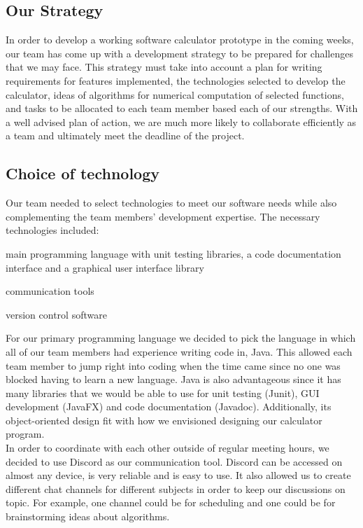 \documentclass[a4paper, 12pt]{article}
\begin{document}
\subsection{Our Strategy}

In order to develop a working software calculator prototype in the coming weeks, our team has come up with a development strategy to be prepared for challenges that we may face. This strategy must take into account a plan for writing requirements for features implemented, the technologies selected to develop the calculator, ideas of algorithms for numerical computation of selected functions, and tasks to be allocated to each team member based each of our strengths. With a well advised plan of action, we are much more likely to collaborate efficiently as a team and ultimately meet the deadline of the project. 

\subsection{Choice of technology}

Our team needed to select technologies to meet our software needs while also complementing the team members’ development expertise. The necessary technologies included:
\medskip
\begin{compactitem}
\item main programming language with unit testing libraries, a code documentation interface and a graphical user interface library
\item communication tools
\item version control software
\end{compactitem}
\medskip
For our primary programming language we decided to pick the language in which all of our team members had experience writing code in, Java. This allowed each team member to jump right into coding when the time came since no one was blocked having to learn a new language. Java is also advantageous since it has many libraries that we would be able to use for unit testing (Junit), GUI development (JavaFX) and code documentation (Javadoc). Additionally, its object-oriented design fit with how we envisioned designing our calculator program. \\

In order to coordinate with each other outside of regular meeting hours, we decided to use Discord as our communication tool. Discord can be accessed on almost any device, is very reliable and is easy to use. It also allowed us to create different chat channels for different subjects in order to keep our discussions on topic. For example, one channel could be for scheduling and one could be for brainstorming ideas about algorithms. \\
\end{document}
